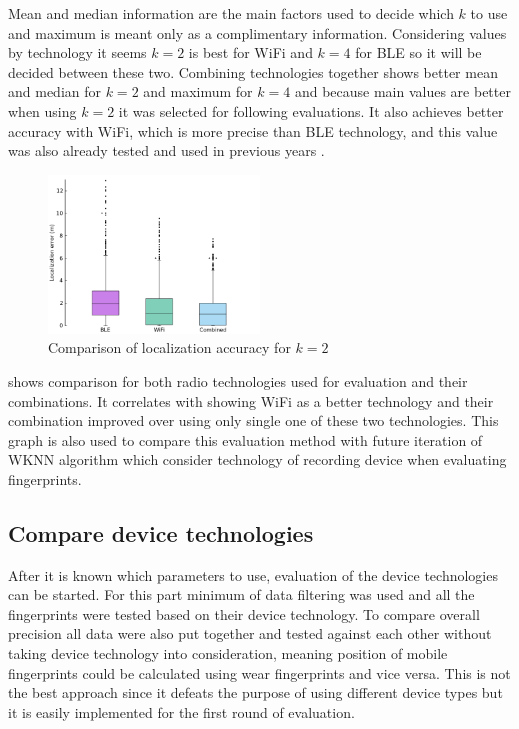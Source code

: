 Mean and median information are the main factors used to decide which $k$ to use and maximum is meant only as a complimentary information. Considering values by technology it seems $k = 2$ is best for WiFi and $k = 4$ for BLE so it will be decided between these two. Combining technologies together shows better mean and median for $k = 2$ and maximum for $k = 4$ and because main values are better when using $k = 2$ it was selected for following evaluations. It also achieves better accuracy with WiFi, which is more precise than BLE technology, and this value was also already tested and used in previous years \cite{IILUBLEB}.

\begin{figure}[h!]
	\begin{centering}
		\includegraphics[width=0.5\textwidth]{img/wknn_errors_classic}
		\par\end{centering}
	\caption{Comparison of localization accuracy for $k = 2$}
	\label{fig04c06}
\end{figure}

 shows comparison for both radio technologies used for evaluation and their combinations. It correlates with  showing WiFi as a better technology and their combination improved over using only single one of these two technologies. This graph is also used to compare this evaluation method with future iteration of WKNN algorithm which consider technology of recording device when evaluating fingerprints.  

\subsection{Compare device technologies}\label{sec:CompareDeviceTechnologies}
After it is known which parameters to use, evaluation of the device technologies can be started. For this part minimum of data filtering was used and all the fingerprints were tested based on their device technology. To compare overall precision all data were also put together and tested against each other without taking device technology into consideration, meaning position of mobile fingerprints could be calculated using wear fingerprints and vice versa. This is not the best approach since it defeats the purpose of using different device types but it is easily implemented for the first round of evaluation.

